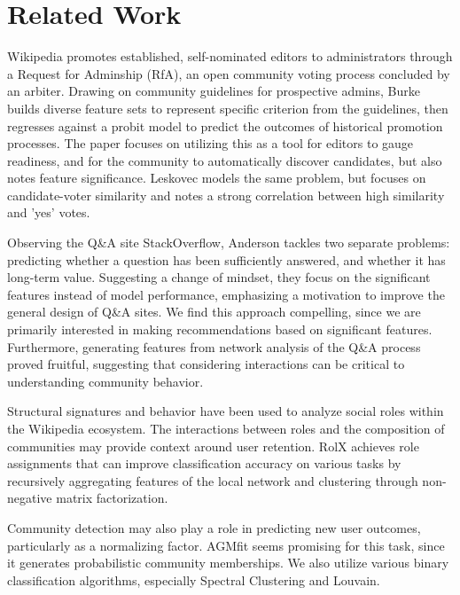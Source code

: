 \documentclass[letterpaper, 12pt, conference]{ieeeconf}
\begin{document}
\section{Related Work}
Wikipedia promotes established, self-nominated editors to administrators through a Request for Adminship (RfA), an open community voting process concluded by an arbiter. Drawing on community guidelines for prospective admins\cite{wiki:rfa}, Burke\cite{burke2008mopping} builds diverse feature sets to represent specific criterion from the guidelines, then regresses against a probit model to predict the outcomes of historical promotion processes. The paper focuses on utilizing this as a tool for editors to gauge readiness, and for the community to automatically discover candidates, but also notes feature significance. Leskovec\cite{leskovec2010governance} models the same problem, but focuses on candidate-voter similarity and notes a strong correlation between high similarity and 'yes' votes.

Observing the Q\&A site StackOverflow, Anderson\cite{anderson2012discovering} tackles two separate problems: predicting whether a question has been sufficiently answered, and whether it has long-term value. Suggesting a change of mindset, they focus on the significant features instead of model performance, emphasizing a motivation to improve the general design of Q\&A sites. We find this approach compelling, since we are primarily interested in making recommendations based on significant features. Furthermore, generating features from network analysis of the Q\&A process proved fruitful, suggesting that considering interactions can be critical to understanding community behavior.

Structural signatures and behavior have been used to analyze social roles\cite{welser2011finding} within the Wikipedia ecosystem. The interactions between roles and the composition of communities may provide context around user retention. RolX\cite{henderson2012rolx} achieves role assignments that can improve classification accuracy on various tasks by recursively aggregating features of the local network and clustering through non-negative matrix factorization.

Community detection may also play a role in predicting new user outcomes, particularly as a normalizing factor. AGMfit\cite{leskovec2016snap} seems promising for this task, since it generates probabilistic community memberships. We also utilize various binary classification algorithms, especially Spectral Clustering and Louvain\cite{louvain2008}.
\end{document}
